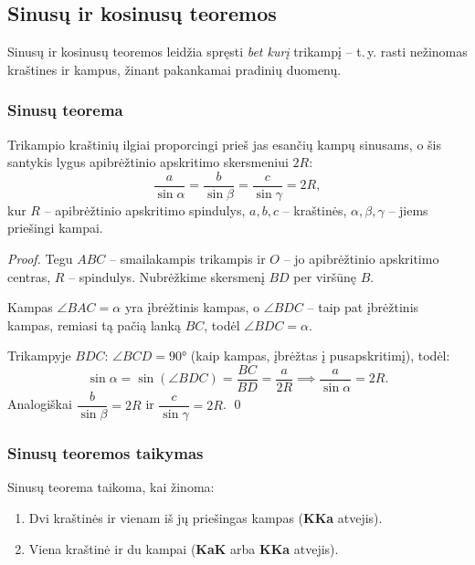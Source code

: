 \subsection{Sinusų ir kosinusų teoremos}

Sinusų ir kosinusų teoremos leidžia spręsti \emph{bet kurį} trikampį –
t.\,y. rasti nežinomas kraštines ir kampus, žinant pakankamai pradinių duomenų.

\subsubsection*{Sinusų teorema}

\begin{theorem}
Trikampio kraštinių ilgiai proporcingi prieš jas esančių kampų sinusams, o šis santykis
lygus apibrėžtinio apskritimo skersmeniui $2R$:
\[
\boxed{\frac{a}{\sin\alpha} = \frac{b}{\sin\beta} = \frac{c}{\sin\gamma} = 2R,}
\]
kur $R$ – apibrėžtinio apskritimo spindulys, $a, b, c$ – kraštinės,
$\alpha, \beta, \gamma$ – jiems priešingi kampai.
\end{theorem}

\begin{proof}
Tegu $ABC$ – smailakampis trikampis ir $O$ – jo apibrėžtinio apskritimo centras,
$R$ – spindulys. Nubrėžkime skersmenį $BD$ per viršūnę $B$.

Kampas $\angle BAC = \alpha$ yra įbrėžtinis kampas, o $\angle BDC$ – taip pat
įbrėžtinis kampas, remiasi tą pačią lanką $BC$, todėl $\angle BDC = \alpha$.

Trikampyje $BDC$: $\angle BCD = 90°$ (kaip kampas, įbrėžtas į pusapskritimį), todėl:
\[
\sin\alpha = \sin(\angle BDC) = \frac{BC}{BD} = \frac{a}{2R}
\implies \frac{a}{\sin\alpha} = 2R.
\]
Analogiškai $\dfrac{b}{\sin\beta} = 2R$ ir $\dfrac{c}{\sin\gamma} = 2R$. \qed
\end{proof}

\subsubsection*{Sinusų teoremos taikymas}

Sinusų teorema taikoma, kai žinoma:
\begin{enumerate}
  \item Dvi kraštinės ir vienam iš jų priešingas kampas (\textbf{KKa} atvejis).
  \item Viena kraštinė ir du kampai (\textbf{KaK} arba \textbf{KKa} atvejis).
\end{enumerate}

